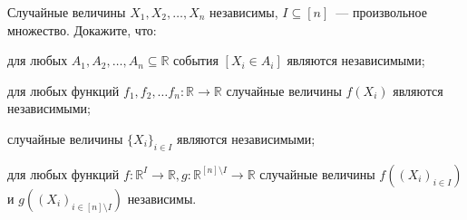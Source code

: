 Случайные величины $X_1, X_2, \dots, X_n$ независимы, $I \subseteq [n]$~--- произвольное
множество. Докажите, что:
\begin{enumcyr}
    \item для любых $A_1, A_2, \dots, A_n \subseteq \mathbb{R}$ события $[X_i \in A_i]$ являются
        независимыми;
    \item для любых функций $f_1, f_2, \dots f_n\colon \mathbb{R} \to \mathbb{R}$ случайные величины $f(X_i)$
        являются независимыми;
    \item случайные величины $\{X_i\}_{i \in I}$ являются независимыми;
    \item для любых функций $f\colon \mathbb{R}^I \to \mathbb{R}, g\colon \mathbb{R}^{[n] \setminus I}
        \to \mathbb{R}$ случайные величины $f((X_i)_{i\in I})$ и $g((X_i)_{i \in [n] \setminus I})$
        независимы.
\end{enumcyr}
